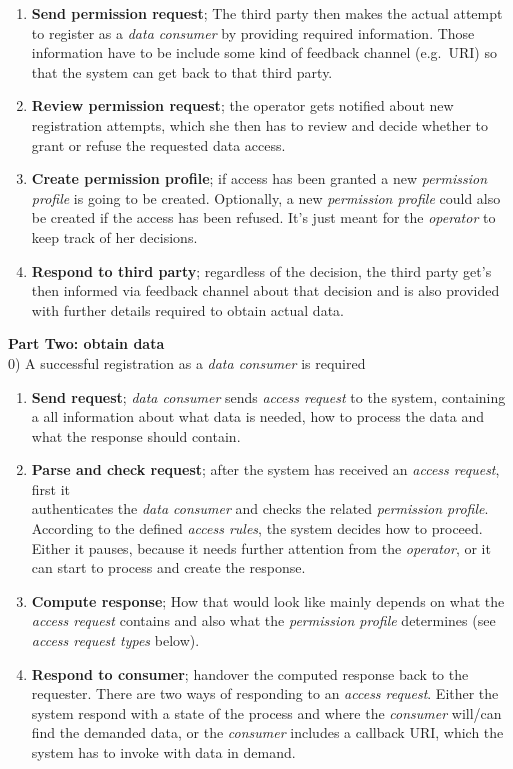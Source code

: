 \documentclass[12pt,english,a4paper,titlepage,cleardoublepage=empty,dottedtoc]{report}
\begin{document}
\begin{enumerate}
\def\labelenumi{\arabic{enumi})}
\setcounter{enumi}{1}
\item
  \textbf{Send permission request}; The third party then makes the
  actual attempt to register as a \emph{data consumer} by providing
  required information. Those information have to be include some kind
  of feedback channel (e.g.~URI) so that the system can get back to that
  third party.
\item
  \textbf{Review permission request}; the operator gets notified about
  new registration attempts, which she then has to review and decide
  whether to grant or refuse the requested data access.
\item
  \textbf{Create permission profile}; if access has been granted a new
  \emph{permission profile} is going to be created. Optionally, a new
  \emph{permission profile} could also be created if the access has been
  refused. It's just meant for the \emph{operator} to keep track of her
  decisions.
\item
  \textbf{Respond to third party}; regardless of the decision, the third
  party get's then informed via feedback channel about that decision and
  is also provided with further details required to obtain actual data.
\end{enumerate}

\textbf{Part Two: obtain data}\\
0) A successful registration as a \emph{data consumer} is required

\begin{enumerate}
\def\labelenumi{\arabic{enumi})}
\item
  \textbf{Send request}; \emph{data consumer} sends \emph{access
  request} to the system, containing a all information about what data
  is needed, how to process the data and what the response should
  contain.
\item
  \textbf{Parse and check request}; after the system has received an
  \emph{access request}, first it\\
  authenticates the \emph{data consumer} and checks the related
  \emph{permission profile}. According to the defined \emph{access
  rules}, the system decides how to proceed. Either it pauses, because
  it needs further attention from the \emph{operator}, or it can start
  to process and create the response.
\item
  \textbf{Compute response}; How that would look like mainly depends on
  what the \emph{access request} contains and also what the
  \emph{permission profile} determines (see \emph{access request types}
  below).
\item
  \textbf{Respond to consumer}; handover the computed response back to
  the requester. There are two ways of responding to an \emph{access
  request}. Either the system respond with a state of the process and
  where the \emph{consumer} will/can find the demanded data, or the
  \emph{consumer} includes a callback URI, which the system has to
  invoke with data in demand.
\end{enumerate}
\end{document}
